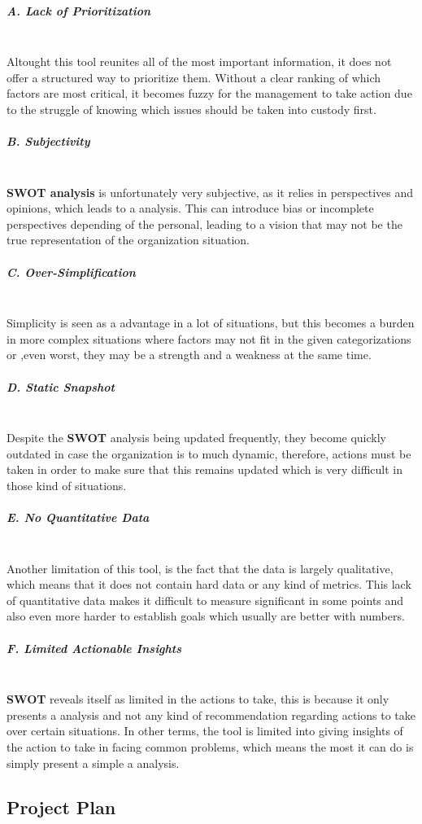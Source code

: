 \subparagraph{A. Lack of Prioritization}\mbox{}\\
Altought this tool reunites all of the most important information, it does not offer a structured way to prioritize them. Without a clear ranking of which factors are most critical, it becomes fuzzy for the management to take action due to the struggle of knowing which issues should be taken into custody first.

\subparagraph{B. Subjectivity}\mbox{}\\
\textbf{SWOT analysis} is unfortunately very subjective, as it relies in perspectives and opinions, which leads to a analysis. This can introduce bias or incomplete perspectives depending of the personal, leading to a vision that may not be the true representation of the organization situation. 

\subparagraph{C. Over-Simplification}\mbox{}\\
Simplicity is seen as a advantage in a lot of situations, but this becomes a burden in more complex situations where factors may not fit in the given categorizations or ,even worst, they may be a strength and a weakness at the same time.

\subparagraph{D. Static Snapshot}\mbox{}\\
Despite the \textbf{SWOT} analysis being updated frequently, they become quickly outdated in case the organization is to much dynamic, therefore, actions must be taken in order to make sure that this remains updated which is very difficult in those kind of situations.

\subparagraph{E. No Quantitative Data}\mbox{}\\
Another limitation of this tool, is the fact that the data is largely qualitative, which means that it does not contain hard data or any kind of metrics. This lack of quantitative data makes it difficult to measure significant in some points and also even more harder to establish goals which usually are better with numbers.

\subparagraph{F. Limited Actionable Insights}\mbox{}\\
\textbf{SWOT} reveals itself as limited in the actions to take, this is because it only presents a analysis and not any kind of recommendation regarding actions to take over certain situations. In other terms, the tool is limited into giving insights of the action to take in facing common problems, which means the most it can do is simply present a simple a analysis.

\subsection{Project Plan}

